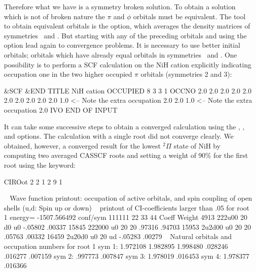 Therefore what we have is a symmetry broken solution. To obtain a solution which
is not of broken nature the $\pi$ and $\phi$ orbitals must be equivalent.
The tool to obtain equivalent orbitals is the  option, which averages
the density matrices of symmetries \bo\ and \bt. But starting with any of the preceding
orbitals and using the  option lead again to convergence problems.
It is necessary to use better initial orbitals; orbitals which have
already equal orbitals in symmetries \bo\ and \bt. One possibility is to perform a
SCF calculation on the NiH cation explicitly indicating occupation one in the two
higher occupied $\pi$ orbitals (symmetries 2 and 3):


\begin{inputlisting}
 &SCF &END
TITLE
 NiH cation
OCCUPIED
 8 3 3 1
OCCNO
2.0 2.0 2.0 2.0 2.0 2.0 2.0 2.0
2.0 2.0 1.0                      <-- Note the extra occupation
2.0 2.0 1.0                      <-- Note the extra occupation
2.0
IVO
END OF INPUT
\end{inputlisting}

It can take some successive steps to obtain a converged calculation using the
, , and  options. The calculation
with a single root did not converge clearly. We obtained, however, a converged 
result for the lowest $^2\Pi$ state of NiH
by computing two averaged CASSCF roots and setting a weight of
90\% for the first root using the keyword:


\begin{inputlisting}
CIROot
 2 2
 1 2
 9 1
\end{inputlisting}

\begin{sourcelisting}
~
                             Wave function printout:
 occupation of active orbitals, and spin coupling of open shells (u,d: Spin up or down)
~
      printout of CI-coefficients larger than   .05 for root   1
      energy=  -1507.566492
      conf/sym  111111 22 33 44     Coeff  Weight
          4913  222u00 20 d0 u0   -.05802  .00337
         15845  222000 u0 20 20    .97316  .94703
         15953  2u2d00 u0 20 20    .05763  .00332
         16459  2u20d0 u0 20 ud   -.05283  .00279
~
      Natural orbitals and occupation numbers for root  1
      sym 1:   1.972108   1.982895   1.998480    .028246    .016277    .007159
      sym 2:    .997773    .007847
      sym 3:   1.978019    .016453
      sym 4:   1.978377    .016366
\end{sourcelisting}

